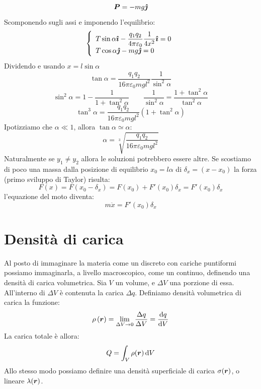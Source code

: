 \begin{equation*}\boldsymbol{P}=-mg\boldsymbol{\hat {\jmath}}\end{equation*}
Scomponendo sugli assi e imponendo l'equilibrio:
\begin{equation*}\left\{\begin{array}{l}
T\sin\alpha\boldsymbol{\hat {\imath}}-\dfrac{q_1q_2}{4\pi\varepsilon_0}\dfrac{1}{4x^2}\boldsymbol{\hat {\imath}}=0\\
T\cos\alpha\boldsymbol{\hat {\jmath}}-mg\boldsymbol{\hat {\jmath}}=0
\end{array}\right.\end{equation*}
Dividendo e usando $x=l\sin\alpha$
\begin{equation*}\tan\alpha=\frac{q_1q_2}{16\pi\varepsilon_0mgl^2}\frac{1}{\sin^2\alpha}\end{equation*}
\begin{equation*}\sin^2\alpha=1-\frac{1}{1+\tan^2\alpha}\qquad\frac{1}{\sin^2\alpha}=\frac{1+\tan^2\alpha}{\tan^2\alpha}\end{equation*}
\begin{equation*}\tan^3\alpha=\frac{q_1q_2}{16\pi\varepsilon_0mgl^2}(1+\tan^2\alpha)\end{equation*}
Ipotizziamo che $\alpha\ll 1$, allora $\tan\alpha\simeq\alpha$:
\begin{equation*}\alpha=\sqrt[3]{\frac{q_1q_2}{16\pi\varepsilon_0mgl^2}}\end{equation*}
Naturalmente se $y_1\neq y_2$ allora le soluzioni potrebbero essere altre. Se scostiamo di poco una massa dalla posizione di equilibrio $x_0=l\alpha$ di $\delta_x=(x-x_0)$ la forza (primo sviluppo di Taylor) risulta:
\begin{equation*}F(x)=F(x_0-\delta_x)=F(x_0)+F'(x_0)\delta_x=F'(x_0)\delta_x\end{equation*}
l'equazione del moto diventa:
\begin{equation*}m\ddot x=F'(x_0)\delta_x\end{equation*}


\section{Densità di carica}
Al posto di immaginare la materia come un discreto con cariche puntiformi possiamo immaginarla, a livello macroscopico, come un continuo, definendo una densità di carica volumetrica. Sia $V$ un volume, e $\Delta V$ una porzione di essa. All'interno di $\Delta V$ è contenuta la carica $\Delta q$. Definiamo densità volumetrica di carica la funzione:
\begin{equation*}\rho\left({\boldsymbol{r}}\right)=\lim_{\Delta V\to 0}\frac{\Delta q}{\Delta V}=\frac{\mathrm{d} q}{\mathrm{d} V}\end{equation*}
La carica totale è allora:
\begin{equation*}Q=\int_V\rho(\boldsymbol{r})\,\mathrm{d} V\end{equation*}
Allo stesso modo possiamo definire una densità superficiale di carica $\sigma(\boldsymbol{r})$, o lineare $\lambda(\boldsymbol{r})$.
